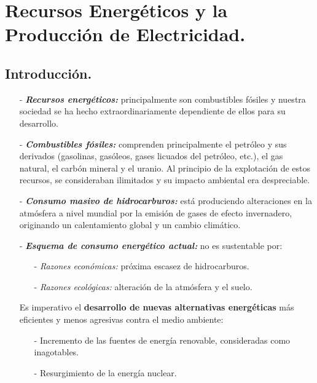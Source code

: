 \chapter{Recursos Energéticos y la Producción de Electricidad.}

\section{Introducción.}
	\begin{itemize}
		\item[-] \textit{\textbf{Recursos energéticos:}}
			principalmente son combustibles fósiles y nuestra sociedad se ha
			hecho extraordinariamente dependiente de ellos para su desarrollo.
		
		\item[-] \textit{\textbf{Combustibles fósiles:}}
			comprenden principalmente el petróleo y sus derivados (gasolinas,
			gasóleos, gases licuados del petróleo, etc.), el gas natural, el carbón mineral y el uranio.\linebreak
			Al principio de la explotación de estos recursos, se consideraban ilimitados y su impacto
			ambiental era despreciable.
			
		\item[-] \textit{\textbf{Consumo masivo de hidrocarburos:}} está produciendo alteraciones en la atmósfera a nivel mundial
		por la emisión de gases de efecto invernadero, originando un calentamiento global y un cambio
		climático.
		
		\item[-] \textit{\textbf{Esquema de consumo energético actual:}} no es sustentable por:
		\begin{itemize}
			\item[-] \textit{Razones económicas:} próxima escasez de hidrocarburos.
			\item[-] \textit{Razones ecológicas:} alteración de la atmósfera y el suelo.
		\end{itemize}
		Es imperativo el \textbf{desarrollo de nuevas alternativas energéticas} más eficientes y menos agresivas contra el medio ambiente:
		\begin{itemize}
			\item[-] Incremento de las fuentes de energía renovable, consideradas como inagotables.
			\item[-] Resurgimiento de la energía nuclear.
		\end{itemize}
	\end{itemize}
	
